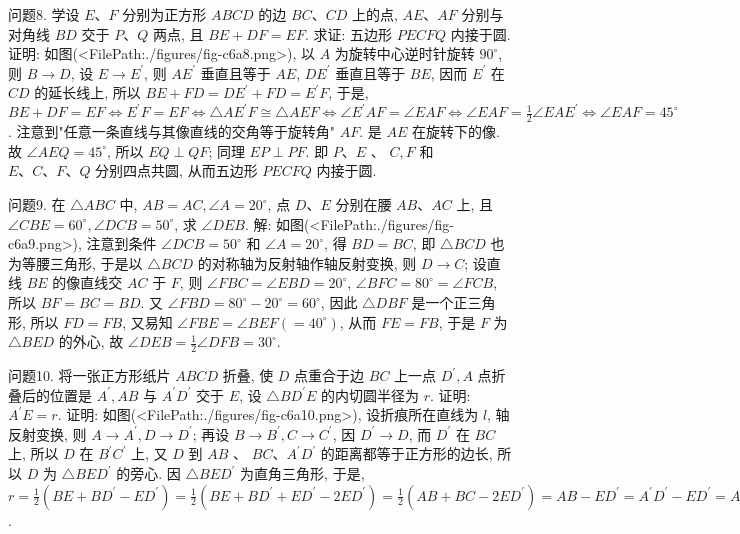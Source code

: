 问题8. 学设 $E 、 F$ 分别为正方形 $A B C D$ 的边 $B C 、 C D$ 上的点, $A E 、 A F$ 分别与对角线 $B D$ 交于 $P 、 Q$ 两点, 且 $B E+D F=E F$. 求证: 五边形 $P E C F Q$ 内接于圆.
证明: 如图(<FilePath:./figures/fig-c6a8.png>), 以 $A$ 为旋转中心逆时针旋转 $90^{\circ}$, 则 $B \rightarrow D$, 设 $E \rightarrow E^{\prime}$, 则 $A E^{\prime}$ 垂直且等于 $A E$, $D E^{\prime}$ 垂直且等于 $B E$, 因而 $E^{\prime}$ 在 $C D$ 的延长线上, 所以 $B E+F D=D E^{\prime}+F D=E^{\prime} F$, 于是, $B E+D F=E F \Leftrightarrow E^{\prime} F=E F \Leftrightarrow \triangle A E^{\prime} F \cong \triangle A E F \Leftrightarrow \angle E^{\prime} A F=\angle E A F \Leftrightarrow \angle E A F=\frac{1}{2} \angle E A E^{\prime} \Leftrightarrow \angle E A F=45^{\circ}$. 注意到"任意一条直线与其像直线的交角等于旋转角" $A F$. 是 $A E$ 在旋转下的像.
故 $\angle A E Q=45^{\circ}$, 所以 $E Q \perp Q F$; 同理 $E P \perp P F$. 即 $P 、 E$ 、 $C, F$ 和 $E 、 C 、 F 、 Q$ 分别四点共圆, 从而五边形 $P E C F Q$ 内接于圆.



问题9. 在 $\triangle A B C$ 中, $A B=A C, \angle A=20^{\circ}$, 点 $D 、 E$ 分别在腰 $A B 、 A C$ 上, 且 $\angle C B E=60^{\circ}, \angle D C B=50^{\circ}$, 求 $\angle D E B$.
解: 如图(<FilePath:./figures/fig-c6a9.png>), 注意到条件 $\angle D C B=50^{\circ}$ 和 $\angle A=20^{\circ}$, 得 $B D=B C$, 即 $\triangle B C D$ 也为等腰三角形, 于是以 $\triangle B C D$ 的对称轴为反射轴作轴反射变换, 则 $D \rightarrow C$; 设直线 $B E$ 的像直线交 $A C$ 于 $F$, 则 $\angle F B C=\angle E B D=20^{\circ}$, $\angle B F C=80^{\circ}=\angle F C B$, 所以 $B F=B C=B D$. 又 $\angle F B D=80^{\circ}-20^{\circ}=60^{\circ}$, 因此 $\triangle D B F$ 是一个正三角形, 所以 $F D=F B$, 又易知 $\angle F B E= \angle B E F\left(=40^{\circ}\right)$, 从而 $F E=F B$, 于是 $F$ 为 $\triangle B E D$ 的外心, 故 $\angle D E B= \frac{1}{2} \angle D F B=30^{\circ}$.



问题10. 将一张正方形纸片 $A B C D$ 折叠, 使 $D$ 点重合于边 $B C$ 上一点 $D^{\prime}, A$ 点折叠后的位置是 $A^{\prime}, A B$ 与 $A^{\prime} D^{\prime}$ 交于 $E$, 设 $\triangle B D^{\prime} E$ 的内切圆半径为 $r$. 证明: $A^{\prime} E=r$.
证明: 如图(<FilePath:./figures/fig-c6a10.png>), 设折痕所在直线为 $l$, 轴反射变换, 则 $A \rightarrow A^{\prime}, D \rightarrow D^{\prime}$; 再设 $B \rightarrow B^{\prime}, C \rightarrow C^{\prime}$, 因 $D^{\prime} \rightarrow D$, 而 $D^{\prime}$ 在 $B C$ 上, 所以 $D$ 在 $B^{\prime} C^{\prime}$ 上, 又 $D$ 到 $A B$ 、 $B C 、 A^{\prime} D^{\prime}$ 的距离都等于正方形的边长, 所以 $D$ 为 $\triangle B E D^{\prime}$ 的旁心.
因 $\triangle B E D^{\prime}$ 为直角三角形, 于是, $r=\frac{1}{2}\left(B E+B D^{\prime}-E D^{\prime}\right)=\frac{1}{2}\left(B E+B D^{\prime}+E D^{\prime}-\right. \left.2 E D^{\prime}\right)=\frac{1}{2}\left(A B+B C-2 E D^{\prime}\right)=A B-E D^{\prime}=A^{\prime} D^{\prime}-E D^{\prime}=A^{\prime} E$.



